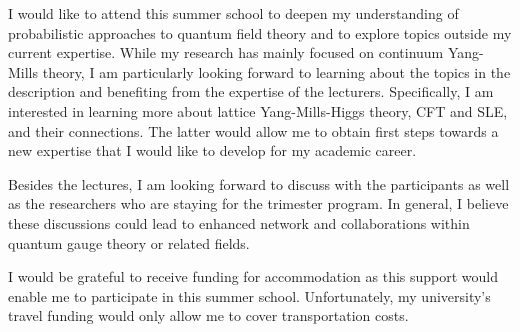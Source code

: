 \documentclass[12pt,a4paper]{moderncv}
\begin{document}
I would like to attend this summer school to deepen my understanding of probabilistic approaches to quantum field theory and to explore topics outside my current expertise. While my research has mainly focused on continuum Yang-Mills theory, I am particularly looking forward to learning about the topics in the description and benefiting from the expertise of the lecturers. Specifically, I am interested in learning more about lattice Yang-Mills-Higgs theory, CFT and SLE, and their connections. The latter would allow me to obtain first steps towards a new expertise that I would like to develop for my academic career.  

Besides the lectures, I am looking forward to discuss with the participants as well as the researchers who are staying for the trimester program. %
In general, I believe these discussions could lead to enhanced network and collaborations within quantum gauge theory or related fields. 

I would be grateful to receive funding for accommodation as this support would enable me to participate in this summer school. Unfortunately, my university's travel funding would only allow me to cover transportation costs. 

\end{document}
